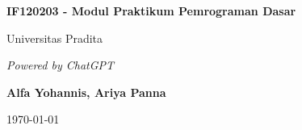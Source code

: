 \documentclass{book}
\begin{document}
		
	\begin{titlepage}
		\centering
		\vspace*{1cm}
		
		\Huge
		\textbf{IF120203 - Modul Praktikum Pemrograman Dasar}
		
		\vspace{0.5cm}
		
		\LARGE
		Universitas Pradita
		
		\vspace{1.5cm}
		
		\textit{Powered by ChatGPT}
		
		\vspace{2cm}
		
		\textbf{Alfa Yohannis, Ariya Panna}
		
		\vspace{0.8cm}
		
		\today
		
		\vfill
	\end{titlepage}
	
	\tableofcontents

	
	
	
	
	
		
\end{document}
